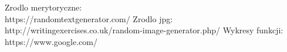 \begin{thebibliography}{9}
Zrodlo merytoryczne:\\
https://randomtextgenerator.com/
Zrodlo jpg:\\
http://writingexercises.co.uk/random-image-generator.php/
Wykresy funkcji:\\
https://www.google.com/
\end{thebibliography}